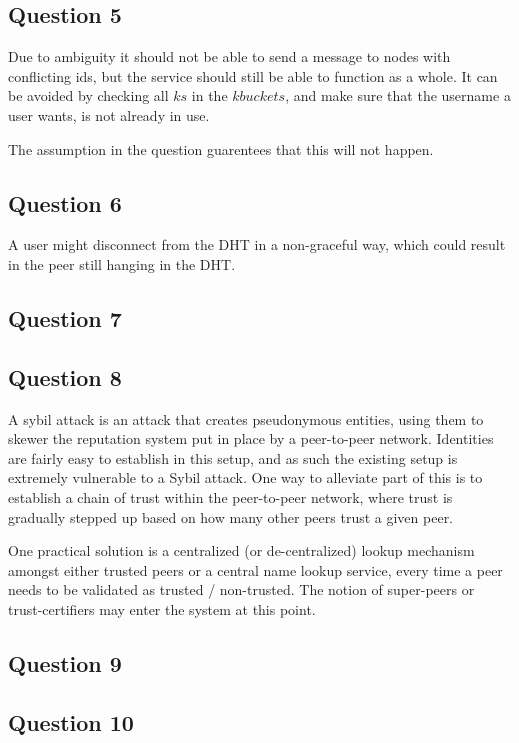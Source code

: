 \subsection{Question 5}
Due to ambiguity it should not be able to send a message to nodes with
conflicting ids, but the service should still be able to function as a
whole. It can be avoided by checking all $ks$ in the $kbuckets$, and
make sure that the username a user wants, is not already in use.

The assumption in the question guarentees that this will not happen.

\subsection{Question 6}
A user might disconnect from the DHT in a non-graceful way, which
could result in the peer still hanging in the DHT.

\subsection{Question 7}

\subsection{Question 8}
A sybil attack is an attack that creates pseudonymous entities, using them
to skewer the reputation system put in place by a peer-to-peer network.
Identities are fairly easy to establish in this setup, and as such the existing
setup is extremely vulnerable to a Sybil attack. One way to alleviate part of
this is to establish a chain of trust within the peer-to-peer network, where
trust is gradually stepped up based on how many other peers trust a given peer.

One practical solution is a centralized (or de-centralized) lookup mechanism
amongst either trusted peers or a central name lookup service, every time a
peer needs to be validated as trusted / non-trusted. The notion of super-peers
or trust-certifiers may enter the system at this point.
\subsection{Question 9}

\subsection{Question 10}

